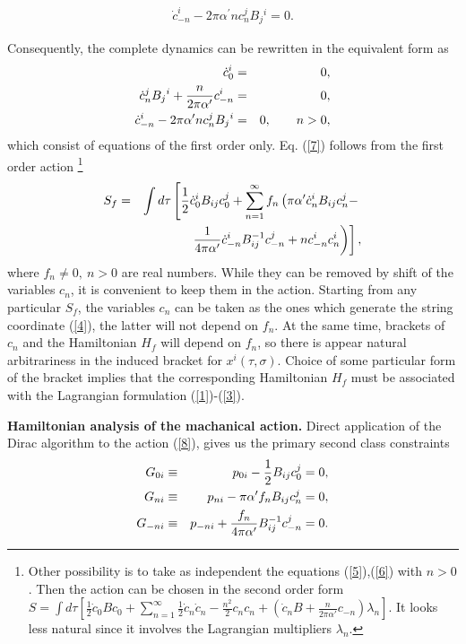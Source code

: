 \documentclass[a4paper]{article}
\begin{document}
\begin{eqnarray}
\label{6.1}
\dot c^i_{-n}- 2\pi\alpha^\prime nc^j_nB_j{}^i=0.
\end{eqnarray} 
\newpage
\par
\noindent Consequently, the complete dynamics can be rewritten in the 
equivalent form as 
\begin{eqnarray}\label{7}
\dot c_0^i&=&0, \cr
\dot c_n^jB_j{}^i+\frac{n}{2\pi\alpha^\prime}c_{-n}^i&=&0, \cr
\dot c_{-n}^i-2\pi\alpha^\prime nc_n^jB_j{}^i&=&0, \qquad n>0,
\end{eqnarray}
which consist of equations of the first order only.
Eq. (\ref{7}) follows from the first order action \footnote{Other 
possibility is to take as independent the equations (\ref{5}),(\ref{6}) 
with $n>0$. Then the action can be chosen in the second order form 
$S=\int d\tau
\left[\frac 12\dot c_0Bc_0+\sum_{n=1}^\infty\frac 12
\dot c_n\dot c_n-\frac{n^2}{2}c_nc_n+(\dot c_nB+
\frac{n}{2\pi\alpha\prime}c_{-n})\lambda_n\right]$.
It looks less natural since it involves the Lagrangian multipliers 
$\lambda_n$.} 
\begin{eqnarray}\label{8}
S_f=&&\int d\tau
\left[\frac 12\dot c_0^iB_{ij}c_0^j+\sum_{n=1}^\infty f_n\left(
\pi\alpha^\prime
\dot c_n^iB_{ij}c_n^j-\right.\right. \cr
&&\left.\left.\frac{1}{4\pi\alpha^\prime}\dot c_{-n}^iB^{-1}_{ij}
c_{-n}^j+nc_{-n}^ic_n^i\right)\right],
\end{eqnarray}
where $f_n\ne 0, ~ n>0$ are real numbers. While they can be removed by 
shift of the variables $c_n$, it is convenient to keep them in the 
action. Starting from any particular $S_f$, the variables $c_n$ can be 
taken as the ones which generate the string coordinate (\ref{4}), the 
latter will not depend on $f_n$. At the same time, brackets of $c_n$ 
and the Hamiltonian $H_f$ will depend on $f_n$, so there is appear 
natural arbitrariness in the induced bracket for $x^i(\tau, \sigma)$. 
Choice of some particular form of the bracket implies that the 
corresponding Hamiltonian $H_f$ must be associated with the Lagrangian 
formulation (\ref{1})-(\ref{3}). 

\noindent
{\bf Hamiltonian analysis of the machanical action.} 
Direct application of the Dirac algorithm to the action  (\ref{8}), gives us the primary second class constraints 
\begin{eqnarray}\label{9}
G_{0i}&\equiv& p_{0i}-\frac12B_{ij}c_0^j=0, \cr 
G_{ni}&\equiv& p_{ni}-\pi\alpha^\prime f_nB_{ij}c_n^j=0, \cr
G_{-ni}&\equiv& p_{-ni}+\frac{f_n}{4\pi\alpha^\prime}B^{-1}_{ij}c_{-n}^j=0.
\end{eqnarray}
\end{document}
